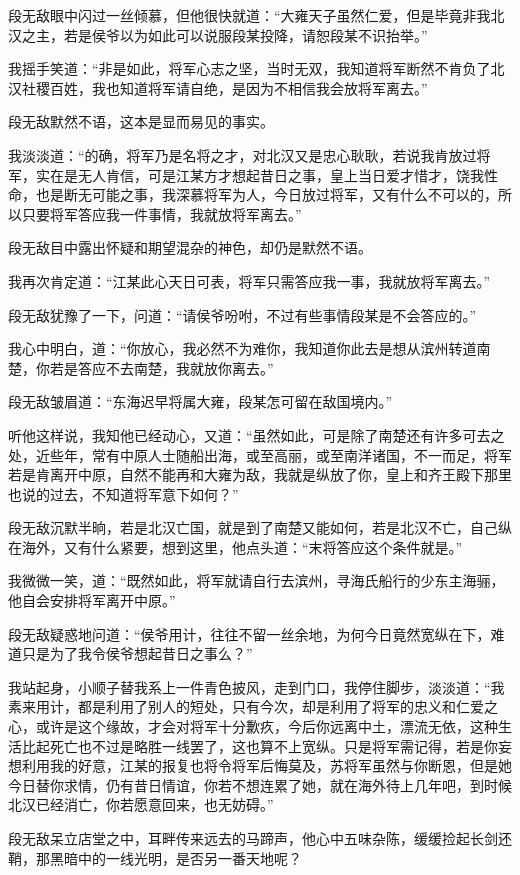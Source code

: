 段无敌眼中闪过一丝倾慕，但他很快就道：“大雍天子虽然仁爱，但是毕竟非我北汉之主，若是侯爷以为如此可以说服段某投降，请恕段某不识抬举。”

我摇手笑道：“非是如此，将军心志之坚，当时无双，我知道将军断然不肯负了北汉社稷百姓，我也知道将军请自绝，是因为不相信我会放将军离去。”

段无敌默然不语，这本是显而易见的事实。

我淡淡道：“的确，将军乃是名将之才，对北汉又是忠心耿耿，若说我肯放过将军，实在是无人肯信，可是江某方才想起昔日之事，皇上当日爱才惜才，饶我性命，也是断无可能之事，我深慕将军为人，今日放过将军，又有什么不可以的，所以只要将军答应我一件事情，我就放将军离去。”

段无敌目中露出怀疑和期望混杂的神色，却仍是默然不语。

我再次肯定道：“江某此心天日可表，将军只需答应我一事，我就放将军离去。”

段无敌犹豫了一下，问道：“请侯爷吩咐，不过有些事情段某是不会答应的。”

我心中明白，道：“你放心，我必然不为难你，我知道你此去是想从滨州转道南楚，你若是答应不去南楚，我就放你离去。”

段无敌皱眉道：“东海迟早将属大雍，段某怎可留在敌国境内。”

听他这样说，我知他已经动心，又道：“虽然如此，可是除了南楚还有许多可去之处，近些年，常有中原人士随船出海，或至高丽，或至南洋诸国，不一而足，将军若是肯离开中原，自然不能再和大雍为敌，我就是纵放了你，皇上和齐王殿下那里也说的过去，不知道将军意下如何？”

段无敌沉默半晌，若是北汉亡国，就是到了南楚又能如何，若是北汉不亡，自己纵在海外，又有什么紧要，想到这里，他点头道：“末将答应这个条件就是。”

我微微一笑，道：“既然如此，将军就请自行去滨州，寻海氏船行的少东主海骊，他自会安排将军离开中原。”

段无敌疑惑地问道：“侯爷用计，往往不留一丝余地，为何今日竟然宽纵在下，难道只是为了我令侯爷想起昔日之事么？”

我站起身，小顺子替我系上一件青色披风，走到门口，我停住脚步，淡淡道：“我素来用计，都是利用了别人的短处，只有今次，却是利用了将军的忠义和仁爱之心，或许是这个缘故，才会对将军十分歉疚，今后你远离中土，漂流无依，这种生活比起死亡也不过是略胜一线罢了，这也算不上宽纵。只是将军需记得，若是你妄想利用我的好意，江某的报复也将令将军后悔莫及，苏将军虽然与你断恩，但是她今日替你求情，仍有昔日情谊，你若不想连累了她，就在海外待上几年吧，到时候北汉已经消亡，你若愿意回来，也无妨碍。”

段无敌呆立店堂之中，耳畔传来远去的马蹄声，他心中五味杂陈，缓缓捡起长剑还鞘，那黑暗中的一线光明，是否另一番天地呢？

